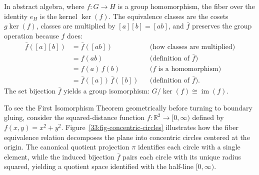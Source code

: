 In abstract algebra, where $f: G \to H$ is a group homomorphism, the fiber over the identity $e_H$ is the kernel $\ker(f)$. The equivalence classes are the cosets $g\ker(f)$, classes are multiplied by $[a][b] = [ab]$, and $\bar{f}$ preserves the group operation because $f$ does:
\begin{align*}
\bar{f}([a][b]) &= \bar{f}([ab]) && \text{(how classes are multiplied)}\\
&= f(ab) && \text{(definition of } \bar{f}\text{)}\\
&= f(a)\,f(b) && \text{(} f \text{ is a homomorphism)}\\
&= \bar{f}([a])\,\bar{f}([b]) && \text{(definition of } \bar{f}\text{)}.
\end{align*}
The set bijection $\bar{f}$ yields a group isomorphism: $G/\ker(f) \cong \operatorname{im}(f)$.

To see the First Isomorphism Theorem geometrically before turning to boundary gluing, consider the squared-distance function $f: \mathbb{R}^2 \to [0, \infty)$ defined by $f(x, y) = x^2 + y^2$. Figure~\ref{33:fig-concentric-circles} illustrates how the fiber equivalence relation decomposes the plane into concentric circles centered at the origin. The canonical quotient projection $\pi$ identifies each circle with a single element, while the induced bijection $\bar{f}$ pairs each circle with its unique radius squared, yielding a quotient space identified with the half-line $[0, \infty)$.

